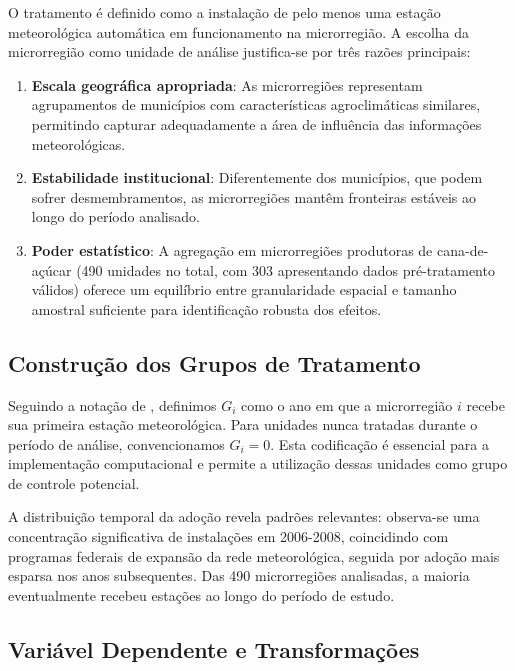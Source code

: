 \documentclass[
	12pt,				%
	oneside,			%
	a4paper,			%
	english,			%
	french,				%
	spanish,			%
	brazil				%
	]{abntex2}
\begin{document}
O tratamento é definido como a instalação de pelo menos uma estação meteorológica automática em funcionamento na microrregião. A escolha da microrregião como unidade de análise justifica-se por três razões principais:

\begin{enumerate}
\item \textbf{Escala geográfica apropriada}: As microrregiões representam agrupamentos de municípios com características agroclimáticas similares, permitindo capturar adequadamente a área de influência das informações meteorológicas.

\item \textbf{Estabilidade institucional}: Diferentemente dos municípios, que podem sofrer desmembramentos, as microrregiões mantêm fronteiras estáveis ao longo do período analisado.

\item \textbf{Poder estatístico}: A agregação em microrregiões produtoras de cana-de-açúcar (490 unidades no total, com 303 apresentando dados pré-tratamento válidos) oferece um equilíbrio entre granularidade espacial e tamanho amostral suficiente para identificação robusta dos efeitos.
\end{enumerate}

\subsection{Construção dos Grupos de Tratamento}

Seguindo a notação de , definimos $G_i$ como o ano em que a microrregião $i$ recebe sua primeira estação meteorológica. Para unidades nunca tratadas durante o período de análise, convencionamos $G_i = 0$. Esta codificação é essencial para a implementação computacional e permite a utilização dessas unidades como grupo de controle potencial.

A distribuição temporal da adoção revela padrões relevantes: observa-se uma concentração significativa de instalações em 2006-2008, coincidindo com programas federais de expansão da rede meteorológica, seguida por adoção mais esparsa nos anos subsequentes. Das 490 microrregiões analisadas, a maioria eventualmente recebeu estações ao longo do período de estudo.

\subsection{Variável Dependente e Transformações}
\end{document}
